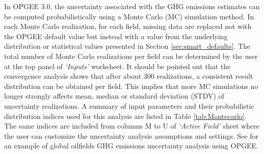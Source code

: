 \documentclass[11pt]{report}
\newcommand{\sheet}[1]{\textit{`{#1}'}}
\begin{document}
In OPGEE 3.0, the uncertainty associated with the GHG emissions estimates can be computed probabilistically using a Monte Carlo (MC) simulation method. In each Monte Carlo realization, for each field, missing data are replaced not with the OPGEE default value but instead with a value from the underlying distribution or statistical values presented in Section \ref{sec:smart_defaults}. The total number of Monte Carlo realizations per field can be determined by the user at the top panel of \sheet{Inputs} worksheet. It should be pointed out that the convergence analysis shows that after about 300 realizations, a consistent result distribution can be obtained per field. This implies that more MC simulations no longer strongly affects mean, median or standard deviation (STDV) of uncertainty realizations. 
A summary of input parameters and their probabilistic distribution indices used for this analysis are listed in Table \ref{tab:Montecarlo}. The same indices are included from columns M to U of \sheet{Active Field} sheet where the user can customize the uncertainty analysis assumptions and settings. See \cite{masnadi2018global} for an example of global oilfields GHG emissions uncertainty analysis using OPGEE.
\end{document}
